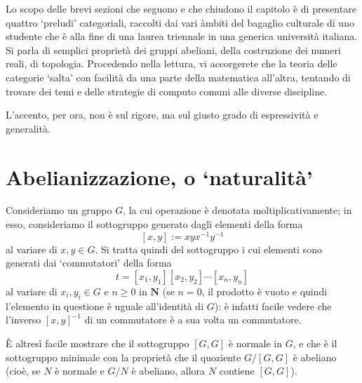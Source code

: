 Lo scopo delle brevi sezioni che seguono e che chiudono il capitolo è di presentare quattro `preludi' categoriali, raccolti dai vari àmbiti del bagaglio culturale di uno studente che è alla fine di una laurea triennale in una generica università italiana. Si parla di semplici proprietà dei gruppi abeliani, della costruzione dei numeri reali, di topologia. Procedendo nella lettura, vi accorgerete che la teoria delle categorie `salta' con facilità da una parte della matematica all'altra, tentando di trovare dei temi e delle strategie di computo comuni alle diverse discipline.

L'accento, per ora, non è sul rigore, ma sul giusto grado di espressività e generalità.
\section*{Abelianizzazione, o `naturalità'}
Consideriamo un gruppo \(G\), la cui operazione è denotata moltiplicativamente; in esso, consideriamo il sottogruppo generato dagli elementi della forma
\[[x,y]:= xyx^{-1}y^{-1}\]
al variare di \(x,y\in G\). Si tratta quindi del sottogruppo i cui elementi sono generati dai `commutatori' della forma
\[t = [x_1,y_1][x_2,y_2]\cdots[x_n,y_n]\]
al variare di \(x_i,y_i\in G\) e \(n\ge 0\) in \(\mathbf{N}\) (se \(n=0\), il prodotto è vuoto e quindi l'elemento in questione è uguale all'identità di \(G\)): è infatti facile vedere che l'inverso \([x,y]^{-1}\) di un commutatore è a sua volta un commutatore.

\`E altresì facile mostrare che il sottogruppo \([G,G]\) è normale in \(G\), e che è il sottogruppo minimale con la proprietà che il quoziente \(G/[G,G]\) è abeliano (cioè, se \(N\) è normale e \(G/N\) è abeliano, allora \(N\) contiene \([G,G]\)).

